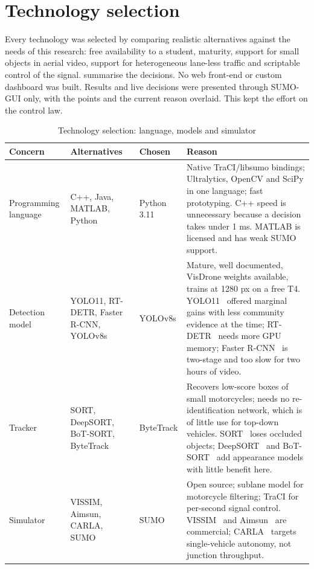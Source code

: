 \section{Technology selection}\label{sec:impl-tech}

Every technology was selected by comparing realistic alternatives against the needs of this
research: free availability to a student, maturity, support for small objects in aerial video,
support for heterogeneous lane-less traffic and scriptable control of the signal.
 summarise the decisions. No web front-end or custom
dashboard was built. Results and live decisions were presented through SUMO-GUI only, with the
\vls{} points and the current \prism{} reason overlaid.  This kept the effort on the control law.

\begin{table}[htbp]
\centering
\caption{Technology selection: language, models and simulator}\label{tab:impl-tech-core}
\small
\begin{tabularx}{\textwidth}{@{}>{\raggedright\arraybackslash}p{2.2cm}>{\raggedright\arraybackslash}p{3.1cm}>{\raggedright\arraybackslash}p{2.1cm}>{\raggedright\arraybackslash}X@{}}
\toprule
Concern & Alternatives & Chosen & Reason\\
\midrule
Programming language & C++, Java, MATLAB, Python & Python 3.11 & Native TraCI/libsumo bindings; Ultralytics, OpenCV and SciPy in one language; fast prototyping. C++ speed is unnecessary because a decision takes under 1 ms. MATLAB is licensed and has weak SUMO support.\\
Detection model & YOLO11, RT-DETR, Faster R-CNN, YOLOv8s & YOLOv8s & Mature, well documented, VisDrone weights available, trains at 1280 px on a free T4. YOLO11~\cite{jocher2024yolo11} offered marginal gains with less community evidence at the time; RT-DETR~\cite{zhao2024rtdetr} needs more GPU memory; Faster R-CNN~\cite{ren2015faster} is two-stage and too slow for two hours of video.\\
Tracker & SORT, DeepSORT, BoT-SORT, ByteTrack & ByteTrack & Recovers low-score boxes of small motorcycles; needs no re-identification network, which is of little use for top-down vehicles. SORT~\cite{bewley2016sort} loses occluded objects; DeepSORT~\cite{wojke2017deepsort} and BoT-SORT~\cite{aharon2022botsort} add appearance models with little benefit here.\\
Simulator & VISSIM, Aimsun, CARLA, SUMO & SUMO & Open source; sublane model for motorcycle filtering; TraCI for per-second signal control. VISSIM~\cite{fellendorf2010vissim} and Aimsun~\cite{casas2010aimsun} are commercial; CARLA~\cite{dosovitskiy2017carla} targets single-vehicle autonomy, not junction throughput.\\
\bottomrule
\end{tabularx}
\end{table}


